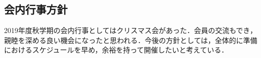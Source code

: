 \subsection*{会内行事方針}

2019年度秋学期の会内行事としてはクリスマス会があった．会員の交流もでき，親睦を深める良い機会になったと思われる．今後の方針としては，全体的に準備におけるスケジュールを早め，余裕を持って開催したいと考えている．

